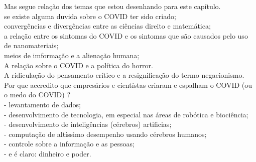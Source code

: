 \documentclass[11pt]{book}
\begin{document}
Mas segue relação dos temas que estou desenhando para este capítulo. \\

se existe alguma duvida sobre o COVID ter sido criado; \\
convergências e divergências entre as ciências direito e matemática; \\
a relação entre os sintomas do COVID e os sintomas que são causados pelo uso de nanomateriais; \\
meios de imformação e a alienação humana; \\
A relação sobre o COVID e a política do horror. \\

A ridiculação do pensamento crítico e a resignificação do termo negacionismo. \\

Por que accredito que empresários e cientístas criaram e espalham o COVID (ou o medo do COVID) ? \\

- levantamento de dados; \\
- desenvolvimento de tecnologia, em especial nas áreas de robótica e biociência; \\
- desenvolvimento de inteligências (cérebros) artificias; \\
- computação de altíssimo desempenho usando cérebros humanos; \\
- controle sobre a informação e as pessoas; \\
- e é claro: dinheiro e poder.
\end{document}
